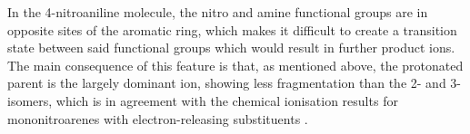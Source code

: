 In the 4-nitroaniline molecule, the nitro and amine functional groups are in opposite sites of the aromatic ring, which makes it difficult to create a transition state between said functional groups which would result in further product ions. 
The main consequence of this feature is that, as mentioned above, the protonated parent is the largely dominant ion, showing less fragmentation than the 2- and 3- isomers, which is in agreement with the chemical ionisation results for mononitroarenes with electron-releasing substituents \cite{harrison1980chemical}.





